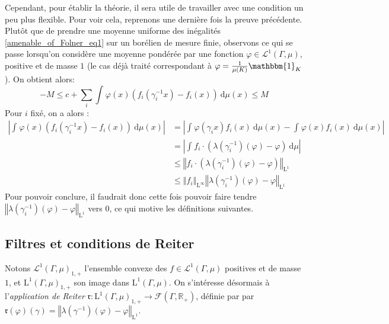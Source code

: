 \documentclass[a4paper,12pt]{article}
\newcommand{\R}{\mathbb{R}}
\newcommand{\norm}[1]{\left\Vert #1\right\Vert}
\newcommand{\abs}[1]{\left\vert#1\right\vert}
\newcommand{\indic}{\mathbbm{1}}
\newcommand{\integral}[4]{\int_{#1}^{#2} #3~\mathrm{d}#4}
\newcommand{\inv}{^{-1}}
\begin{document}
Cependant, pour établir la théorie, il sera utile de travailler avec une condition un peu plus flexible. Pour voir cela, reprenons une dernière fois la preuve
précédente. Plutôt que de prendre une moyenne uniforme des inégalités \ref{amenable_of_Folner_eq1} sur un borélien de mesure finie, observons ce qui se passe 
lorsqu'on considère une moyenne pondérée par une fonction $\varphi\in\mathscr{L}^1(\Gamma, \mu)$, positive et de masse $1$ (le cas déjà traité correspondant à $\varphi=\frac1{\mu(K)}\indic_K$).
On obtient alors:
\begin{equation*}\label{intuition_Reiter_eq1}
    -M \le c + \sum_i \integral{}{}{\varphi(x)\left(f_i(\gamma_i\inv x) - f_i(x)\right)}{\mu(x)} \le M
\end{equation*}
Pour $i$ fixé, on a alors :
\begin{align*}
    \abs{\integral{}{}{\varphi(x)(f_i(\gamma_i\inv x) - f_i(x))}{\mu(x)}} 
        &= \abs{\integral{}{}{\varphi(\gamma_i x)f_i(x)}{\mu(x)} - \integral{}{}{\varphi(x) f_i(x)}{\mu(x)}} \\
        &= \abs{\integral{}{}{f_i\cdot\left(\lambda(\gamma_i\inv)(\varphi)-\varphi\right)}{\mu}} \\
        &\le \norm{f_i\cdot\left(\lambda(\gamma_i\inv)(\varphi)-\varphi\right)}_{\mathrm{L}^1} \\
        &\le \norm{f_i}_{\mathrm{L}^\infty} \norm{\lambda(\gamma_i\inv)(\varphi)-\varphi}_{\mathrm{L}^1}
\end{align*}
Pour pouvoir conclure, il faudrait donc cette fois pouvoir faire tendre $\norm{\lambda(\gamma_i\inv)(\varphi)-\varphi}_{\mathrm{L}^1}$ vers $0$, ce qui motive les définitions suivantes.

\subsection{Filtres et conditions de Reiter}

Notons $\mathscr{L}^1(\Gamma, \mu)_{1,+}$ l'ensemble convexe des $f\in\mathscr{L}^1(\Gamma, \mu)$ positives et de masse $1$, et $\mathrm{L}^1(\Gamma, \mu)_{1, +}$ son image dans 
$\mathrm{L}^1(\Gamma, \mu)$. On s'intéresse désormais à l'\emph{application de Reiter} $\mathfrak{r} : \mathrm{L}^1(\Gamma, \mu)_{1, +}\to\mathcal{F}(\Gamma, \R_+)$, définie par
par $\mathfrak{r}(\varphi)(\gamma) = \norm{\lambda(\gamma\inv)(\varphi)-\varphi}_{\mathrm{L}^1}$.
\end{document}
